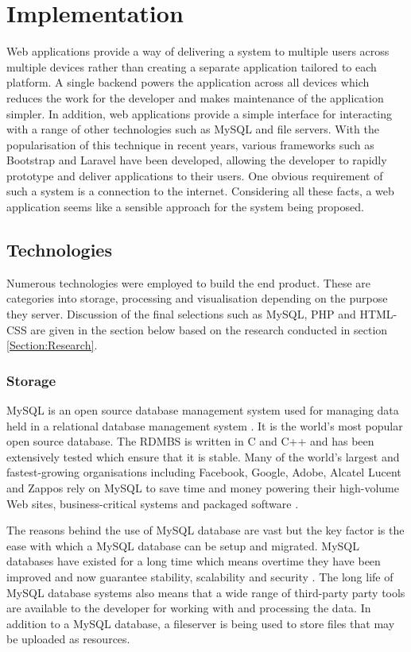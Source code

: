 \section{Implementation}\label{Section:Implementation}
Web applications provide a way of delivering a system to multiple users across multiple devices rather than creating a separate application tailored to each platform. A single backend powers the application across all devices which reduces the work for the developer and makes maintenance of the application simpler. In addition, web applications provide a simple interface for interacting with a range of other technologies such as MySQL and file servers. With the popularisation of this technique in recent years, various frameworks such as Bootstrap and Laravel have been developed, allowing the developer to rapidly prototype and deliver applications to their users. One obvious requirement of such a system is a connection to the internet. Considering all these facts, a web application seems like a sensible approach for the system being proposed.

\subsection{Technologies}
Numerous technologies were employed to build the end product. These are categories into storage, processing and visualisation depending on the purpose they server. Discussion of the final selections such as MySQL, PHP and HTML-CSS are given in the section below based on the research conducted in section \ref{Section:Research}.

\subsubsection{Storage}
MySQL is an open source database management system used for managing data held in a relational database management system \cite{MySQL:Home}. It is the world's most popular open source database. The RDMBS is written in C and C++ and has been extensively tested which ensure that it is stable. Many of the world's largest and fastest-growing organisations including Facebook, Google, Adobe, Alcatel Lucent and Zappos rely on MySQL to save time and money powering their high-volume Web sites, business-critical systems and packaged software \cite{MySQL:Home}. 

The reasons behind the use of MySQL database are vast but the key factor is the ease with which a MySQL database can be setup and migrated. MySQL databases have existed for a long time which means overtime they have been improved and now guarantee stability, scalability and security \cite{MySQL:Why}. The long life of MySQL database systems also means that a wide range of third-party party tools are available to the developer for working with and processing the data. In addition to a MySQL database, a fileserver is being used to store files that may be uploaded as resources.

